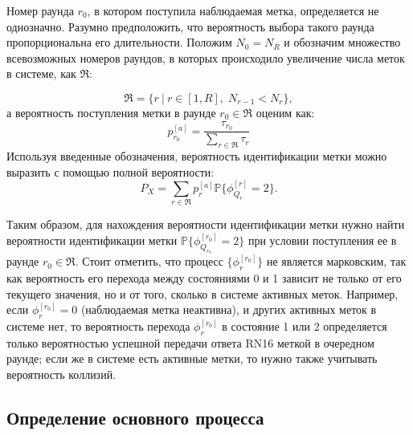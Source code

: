 Номер раунда $r_0$, в котором поступила наблюдаемая метка, определяется не однозначно. Разумно предположить, что вероятность выбора такого раунда пропорциональна его длительности. Положим $N_0 = N_R$ и обозначим множество всевозможных номеров раундов, в которых происходило увеличение числа меток в системе, как $\mathfrak{R}$:

$$
	\mathfrak{R} = \{ r\:|\:r \in [1, R],\; N_{r-1} < N_r \},
$$
а вероятность поступления метки в раунде $r_0 \in \mathfrak{R}$ оценим как:
\begin{equation}\label{eq:ch3_fg_prob_arrival}
	p^{[a]}_{r_0} = \frac{\tau_{r_0}}{\sum_{r \in \mathfrak{R}} \tau_r}
\end{equation}
Используя введенные обозначения, вероятность идентификации метки можно выразить с помощью полной вероятности:
\begin{equation}\label{eq:ch3_tag_id_prob_phi}
	P_X = \sum\limits_{r \in \mathfrak{R}} p^{[a]}_r \mathbb{P}\{ \phi^{[r]}_{Q_r} = 2 \}.
\end{equation}

Таким образом, для нахождения вероятности идентификации метки нужно найти вероятности идентификации метки $\mathbb{P}\{ \phi^{[r_0]}_{Q_{r_0}} = 2 \}$ при условии поступления ее в раунде $r_0 \in \mathfrak{R}$. Стоит отметить, что процесс $\{ \phi^{[r_0]}_r \}$ не является марковским, так как вероятность его перехода между состояниями 0 и 1 зависит не только от его текущего значения, но и от того, сколько в системе активных меток. Например, если $\phi_r^{[r_0]} = 0$ (наблюдаемая метка неактивна), и других активных меток в системе нет, то вероятность перехода $\phi_r^{[r_0]}$ в состояние 1 или 2 определяется только вероятностью успешной передачи ответа RN16 меткой в очередном раунде; если же в системе есть активные метки, то нужно также учитывать вероятность коллизий.



\subsection{Определение основного процесса}

